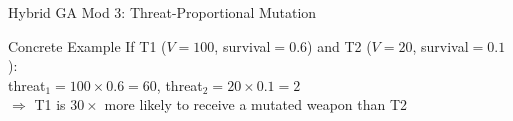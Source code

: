 \documentclass[aspectratio=169,10pt]{beamer}
\begin{document}
\begin{frame}[shrink=5]{Hybrid GA Mod 3: Threat-Proportional Mutation}
  \vspace{0.15cm}

  \begin{block}{Concrete Example}
    \small
    If T1 ($V=100$, survival$=0.6$) and T2 ($V=20$, survival$=0.1$):\\[3pt]
    \quad threat$_1 = 100 \times 0.6 = 60$,\qquad
         threat$_2 = 20 \times 0.1 = 2$\\[3pt]
    $\Rightarrow$ T1 is $30\times$ more likely to receive a mutated weapon than T2
  \end{block}

\end{frame}


\end{document}
